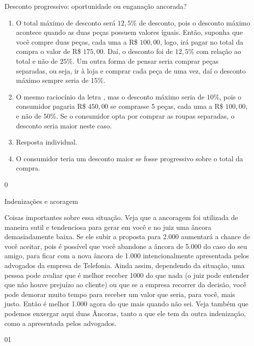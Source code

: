 \begin{answer}{Desconto progressivo: oportunidade ou enganação ancorada?}
{
  \begin{enumerate}
    \item O total máximo de desconto será $12{,}5$\% de desconto, pois o desconto máximo acontece quando as duas peças possuem valores iguais. Então, suponha que você compre duas peças, cada uma a R\$ $100{,}00$, logo, irá pagar no total da compra o valor de R\$ $175{,}00$. Daí, o desconto foi de $12{,}5$\% com relação ao total e não de $25$\%. Um outra forma de pensar seria comprar peças separadas, ou seja, ir à loja e comprar cada peça de uma vez, daí o desconto máximo sempre seria de $15$\%.
    \item O mesmo raciocínio da letra , mas o desconto máximo seria de $10$\%, pois o consumidor pagaria R\$ $450{,}00$ se comprasse 5 peças, cada uma a R\$ $100{,}00$, e não de $50$\%. Se o consumidor opta por comprar as roupas separadas, o desconto seria maior neste caso.
    \item Resposta individual.
    \item O consumidor teria um desconto maior se fosse progressivo sobre o total da compra.
  \end{enumerate}  
}{0}
\end{answer}
\begin{sugestions}{Indenizações e acoragem}
{
Coisas importantes sobre essa situação. Veja que a ancoragem foi utilizada de maneira sutil e tendenciosa para gerar em você e no juiz uma âncora demasiadamente baixa. Se ele subir a proposta para 2.000 aumentará a chance de você aceitar, pois é possível que você abandone a âncora de 5.000 do caso do seu amigo, para ficar com a nova âncora de 1.000 intencionalmente apresentada pelos advogados da empresa de Telefonia. 
Ainda assim, dependendo da situação, uma pessoa pode avaliar que é melhor receber 1000 do que nada (o juiz pode entender que não houve prejuízo ao cliente) ou que se a empresa recorrer da decisão, você pode demorar muito tempo para receber um valor que seria, para você, mais justo. Então é melhor 1.000 agora do que mais quando não sei. 
Veja também que podemos enxergar aqui duas Âncoras, tanto a que ele tem da outra indenização, como a apresentada pelos advogados. 

}{0}{1}
\end{sugestions}


